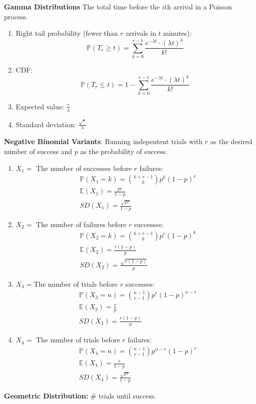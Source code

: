 \documentclass[titlepage, 12pt, leqno]{article}
\begin{document}
\begin{multicols*}{2}
\begin{enumerate}
\end{enumerate}
\columnbreak
\textbf{Gamma Distributions}
The total time before the $i$th arrival in a Poisson process.
\begin{enumerate}
    \item Right tail probability (fewer than $r$ arrivals in $t$ minutes): 
        \[
            \mathbb{P}(T_r \ge t)  = 
            \sum_{k=0}^{r-1}\frac{e^{-\lambda t}\cdot (\lambda t) ^k}{k!}
        \]
    \item CDF:
        \[
            \mathbb{P}(T_r\le t) = 1 - 
            \sum_{k=0}^{r-1}\frac{e^{-\lambda t}\cdot (\lambda t) ^k}{k!}
        \]
        
    \item Expected value: $\frac{r}{\lambda}$ 
    \item Standard deviation: $\frac{\sqrt{r}}{\lambda}$
\end{enumerate}
\textbf{Negative Binomial Variants}: Running indepentent trials with $r$ as the
desired number of success and $p$ as the probability of success.
\begin{enumerate}
    \item $X_1 = $ The number of successes before $r$ failures:
       \begin{align*}
           & \mathbb{P}(X_1 = k) = \binom{k+r-1}{k}p^k(1-p)^r \\
           & \mathbb{E}(X_1) = \frac{pr}{1-p} \\
           & SD(X_1) = \frac{\sqrt{pr}}{1-p}
       \end{align*}
    \item $X_2 = $ The number of failures before $r$ successes:
       \begin{align*}
           & \mathbb{P}(X_2 = k) = \binom{k+r-1}{k}p^r(1-p)^k \\
           & \mathbb{E}(X_2) = \frac{r(1-p)}{p} \\
           & SD(X_2) = \frac{\sqrt{r(1-p)}}{p}
       \end{align*}
    \item $X_3 = $The number of trials before $r$ successes:
       \begin{align*}
           & \mathbb{P}(X_3 = n) = \binom{n-1}{r-1}p^r(1-p)^{n-r} \\
           & \mathbb{E}(X_3) = \frac{r}{p} \\
           & SD(X_3) = \frac{r(1-p)}{p}
       \end{align*}
    \item $X_4 = $ The number of trials before $r$ failures:
       \begin{align*}
           & \mathbb{P}(X_4 = n) = \binom{n-1}{r-1}p^{n-r}(1-p)^r \\
           & \mathbb{E}(X_4) = \frac{r}{1-p} \\
           & SD(X_4) = \frac{\sqrt{pr}}{1-p}
       \end{align*}
\end{enumerate}
\pagebreak
\textbf{Geometric Distribution:} \# trials until success.


\end{multicols*}
\end{document}
